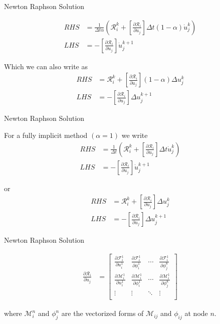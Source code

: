 \documentclass[11pt]{beamer}
\begin{document}
\begin{frame}{Newton Raphson Solution}

\begin{align*}
RHS &= \frac{1}{\Delta t \alpha}\left(\mathcal{R}_i^k + \left[\frac{\partial \mathcal{R}_i}{\partial u_j}\right] \Delta t \left(1-\alpha\right) \dot{u}_j^k \right)\\
LHS &= - \left[\frac{\partial \mathcal{R}_i}{\partial u_j}\right] \dot{u}_j^{k+1}
\end{align*}

Which we can also write as
\begin{align*}
RHS &= \mathcal{R}_i^k + \left[\frac{\partial \mathcal{R}_i}{\partial u_j}\right] \left(1-\alpha\right) \Delta u_j^k\\
LHS &= - \left[\frac{\partial \mathcal{R}_i}{\partial u_j}\right] \Delta u_j^{k+1}
\end{align*}

\end{frame}

\begin{frame}{Newton Raphson Solution}

For a fully implicit method $(\alpha = 1)$ we write
\begin{align*}
RHS &= \frac{1}{\Delta t}\left(\mathcal{R}_i^k + \left[\frac{\partial \mathcal{R}_i}{\partial u_j}\right] \Delta t \dot{u}_j^k \right)\\
LHS &= - \left[\frac{\partial \mathcal{R}_i}{\partial u_j}\right] \dot{u}_j^{k+1}
\end{align*}

or
\begin{align*}
RHS &= \mathcal{R}_i^k + \left[\frac{\partial \mathcal{R}_i}{\partial u_j}\right] \Delta u_j^k \\
LHS &= - \left[\frac{\partial \mathcal{R}_i}{\partial u_j}\right] \Delta u_j^{k+1}
\end{align*}


\end{frame}

\begin{frame}{Newton Raphson Solution}

\begin{align*}
\frac{\partial \mathcal{R}_i}{\partial u_j} &= \left[\begin{array}{cccc}
\frac{\partial \mathcal{F}_i^1}{\partial u_i^1} & \frac{\partial \mathcal{F}_i^1}{\partial \phi_i^1} & \cdots & \frac{\partial \mathcal{F}_i^1}{\partial \phi_{j}^8}\\
\frac{\partial \mathcal{M}_i^1}{\partial u_i^1} & \frac{\partial \mathcal{M}_i^1}{\partial \phi_i^1} & \cdots & \frac{\partial \mathcal{M}_i^1}{\partial \phi_{j}^8}\\
\vdots & \vdots & \ddots & \vdots\\
\end{array}\right]
\end{align*}

where $\mathcal{M}_i^n$ and $\phi_{j}^n$ are the vectorized forms of $\mathcal{M}_{ij}$ and $\phi_{ij}$ at node $n$.

\end{frame}
\end{document}
